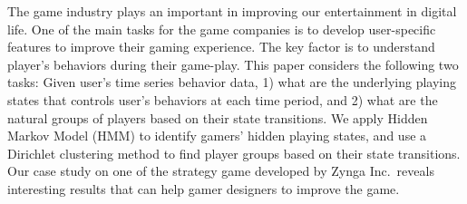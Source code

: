The game industry plays an important in improving our entertainment in digital life.  One 
of the main tasks for the game companies is to develop user-specific features to 
improve their gaming experience. The key factor is to understand player's behaviors during their 
game-play. This paper  considers the following two tasks: 
Given user's time series behavior data, 1) what are the underlying playing states that 
controls user's behaviors at each time period, and 2) what are the natural groups of players based 
on their state transitions. We apply Hidden Markov Model (HMM) to identify gamers' 
hidden playing states, and use a Dirichlet clustering method to find player groups based on 
their state transitions. Our case study on one of the strategy game developed by Zynga Inc.\  
reveals interesting results that can help gamer designers to improve the game.




